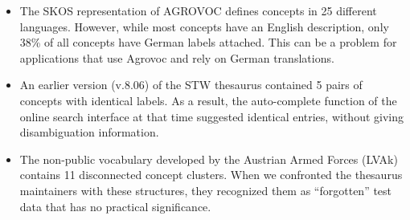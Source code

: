 \begin{itemize}

	\item The SKOS representation of AGROVOC defines concepts in 25 different languages. However, while most concepts have an English description, only 38\% of all concepts have German labels attached. This can be a problem for applications that use Agrovoc and rely on German translations.

	\item An earlier version (v.8.06) of the STW thesaurus contained 5 pairs of concepts with identical labels. As a result, the auto-complete function of the online search interface at that time suggested identical entries, without giving disambiguation information.


	\item The non-public vocabulary developed by the Austrian Armed Forces (LVAk) contains 11 disconnected concept clusters. When we confronted the thesaurus maintainers with these structures, they recognized them as ``forgotten'' test data that has no practical significance.
	


\end{itemize}

